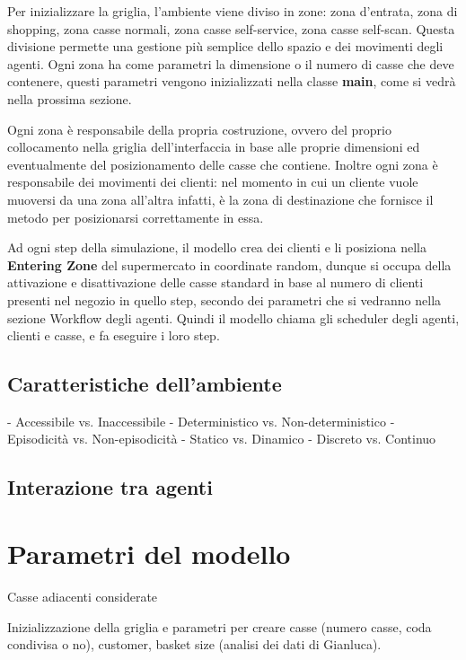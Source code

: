 Per inizializzare la griglia, l'ambiente viene diviso in zone: zona d'entrata, zona di shopping, zona casse normali, zona casse self-service, zona casse self-scan. Questa divisione permette una gestione più semplice dello spazio e dei movimenti degli agenti. Ogni zona ha come parametri la dimensione o il numero di casse che deve contenere, questi parametri vengono inizializzati nella classe \textbf{main}, come si vedrà nella prossima sezione.

Ogni zona è responsabile della propria costruzione, ovvero del proprio collocamento nella griglia dell'interfaccia in base alle proprie dimensioni ed eventualmente del posizionamento delle casse che contiene. Inoltre ogni zona è responsabile dei movimenti dei clienti: nel momento in cui un cliente vuole muoversi da una zona all'altra infatti, è la zona di destinazione che fornisce il metodo per posizionarsi correttamente in essa.

 Ad ogni step della simulazione, il modello crea dei clienti e li posiziona nella \textbf{Entering Zone} del supermercato in coordinate random, dunque si occupa della attivazione e disattivazione delle casse standard in base al numero di clienti presenti nel negozio in quello step, secondo dei parametri che si vedranno nella sezione  Workflow degli agenti. Quindi il modello chiama gli scheduler degli agenti, clienti e casse, e fa eseguire i loro step.

\subsection{Caratteristiche dell'ambiente}
- Accessibile vs. Inaccessibile
- Deterministico vs. Non-deterministico
- Episodicità vs. Non-episodicità
- Statico vs. Dinamico
- Discreto vs. Continuo

\subsection{Interazione tra agenti}

\section{Parametri del modello}
\label{model:parameters}

Casse adiacenti considerate

Inizializzazione della griglia e parametri per creare casse (numero casse, coda condivisa o no), customer, basket size (analisi dei dati di Gianluca).

